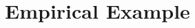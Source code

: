 \documentclass[twoside, 11pt]{article}
\begin{document}





\section{Empirical Example} \label{emp-example}  
\end{document}
